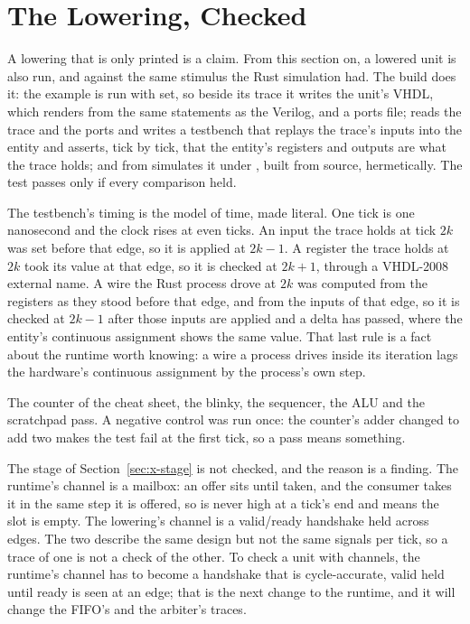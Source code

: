 \section{The Lowering, Checked}
\label{sec:x-checked}

A lowering that is only printed is a claim. From this section on, a
lowered unit is also run, and against the same stimulus the Rust
simulation had. The build does it: the example is run with
 set, so beside its trace it writes the unit's VHDL,
which \code{\#[lower]} renders from the same statements as the
Verilog, and a ports file;  reads the trace and
the ports and writes a testbench that replays the trace's inputs into
the entity and asserts, tick by tick, that the entity's registers and
outputs are what the trace holds; and  from
 simulates it under , built from source,
hermetically. The test passes only if every comparison held.

The testbench's timing is the model of time, made literal. One tick is
one nanosecond and the clock rises at even ticks. An input the trace
holds at tick $2k$ was set before that edge, so it is applied at
$2k-1$. A register the trace holds at $2k$ took its value at that
edge, so it is checked at $2k+1$, through a VHDL-2008 external name.
A wire the Rust process drove at $2k$ was computed from the registers
as they stood before that edge, and from the inputs of that edge, so
it is checked at $2k-1$ after those inputs are applied and a delta
has passed, where the entity's continuous assignment shows the same
value. That last rule
is a fact about the runtime worth knowing: a wire a process drives
inside its iteration lags the hardware's continuous assignment by the
process's own step.

The counter of the cheat sheet, the blinky, the sequencer, the ALU
and the scratchpad pass.
A negative control was run once: the counter's adder changed to add
two makes the test fail at the first tick, so a pass means something.

The stage of Section~\ref{sec:x-stage} is not checked, and the reason
is a finding. The runtime's channel is a mailbox: an offer sits until
taken, and the consumer takes it in the same step it is offered, so
 is never high at a tick's end and  means the
slot is empty. The lowering's channel is a valid/ready handshake held
across edges. The two describe the same design but not the same
signals per tick, so a trace of one is not a check of the other. To
check a unit with channels, the runtime's channel has to become a
handshake that is cycle-accurate, valid held until ready is seen at an
edge; that is the next change to the runtime, and it will change the
FIFO's and the arbiter's traces.
